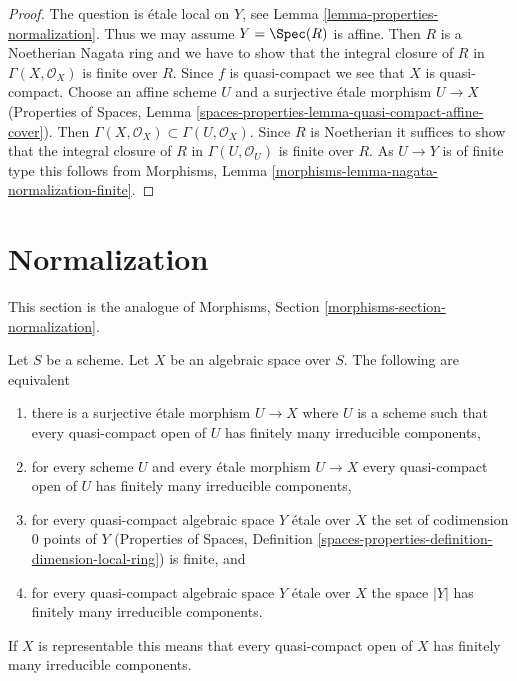 \begin{proof}
The question is \'etale local on $Y$, see
Lemma \ref{lemma-properties-normalization}.
Thus we may assume $Y = \Spec(R)$ is affine.
Then $R$ is a Noetherian Nagata ring
and we have to show that the integral closure of
$R$ in $\Gamma(X, \mathcal{O}_X)$ is finite over $R$.
Since $f$ is quasi-compact we see that $X$ is quasi-compact.
Choose an affine scheme $U$ and a surjective \'etale
morphism $U \to X$ (Properties of Spaces, Lemma
\ref{spaces-properties-lemma-quasi-compact-affine-cover}).
Then $\Gamma(X, \mathcal{O}_X) \subset \Gamma(U, \mathcal{O}_X)$.
Since $R$ is Noetherian it suffices to show that
the integral closure of $R$ in $\Gamma(U, \mathcal{O}_U)$
is finite over $R$. As $U \to Y$ is of finite type
this follows from
Morphisms, Lemma \ref{morphisms-lemma-nagata-normalization-finite}.
\end{proof}






\section{Normalization}
\label{section-normalization}

\noindent
This section is the analogue of
Morphisms, Section \ref{morphisms-section-normalization}.

\begin{lemma}
\label{lemma-prepare-normalization}
Let $S$ be a scheme. Let $X$ be an algebraic space over $S$.
The following are equivalent
\begin{enumerate}
\item there is a surjective \'etale morphism $U \to X$ where $U$
is a scheme such that every quasi-compact open of $U$ has
finitely many irreducible components,
\item for every scheme $U$ and every \'etale morphism
$U \to X$ every quasi-compact open of $U$ has finitely many
irreducible components,
\item for every quasi-compact algebraic space $Y$ \'etale over $X$
the set of codimension $0$ points of $Y$ (Properties of Spaces,
Definition \ref{spaces-properties-definition-dimension-local-ring})
is finite, and
\item for every quasi-compact algebraic space $Y$ \'etale over $X$
the space $|Y|$ has finitely many irreducible components.
\end{enumerate}
If $X$ is representable this means that every quasi-compact open of $X$
has finitely many irreducible components.
\end{lemma}

